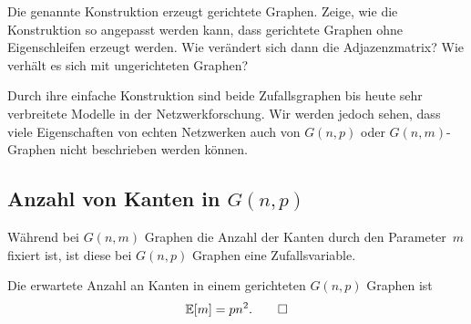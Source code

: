 \begin{center}

\end{center}

\begin{exercise}
    Die genannte Konstruktion erzeugt gerichtete Graphen.
    Zeige, wie die Konstruktion so angepasst werden kann, dass gerichtete Graphen ohne Eigenschleifen erzeugt werden.
    Wie verändert sich dann die Adjazenzmatrix?
    Wie verhält es sich mit ungerichteten Graphen?
\end{exercise}

Durch ihre einfache Konstruktion sind beide Zufallsgraphen bis heute sehr verbreitete Modelle in der Netzwerkforschung.
Wir werden jedoch sehen, dass viele Eigenschaften von echten Netzwerken auch von $G(n,p)$ oder $G(n,m)$-Graphen nicht beschrieben werden können.

\subsection{Anzahl von Kanten in $G(n, p)$}
Während bei $G(n,m)$ Graphen die Anzahl der Kanten durch den Parameter~$m$ fixiert ist, ist diese bei $G(n,p)$ Graphen eine Zufallsvariable.

\begin{lemma}\label{lemma:erwartete_kanten_in_gnp}
    Die  erwartete Anzahl an Kanten in einem gerichteten $G(n,p)$ Graphen ist \begin{equation*} \mathbb{E}\!\left[m\right] = p n^2. \qedhere \end{equation*}
\end{lemma}

